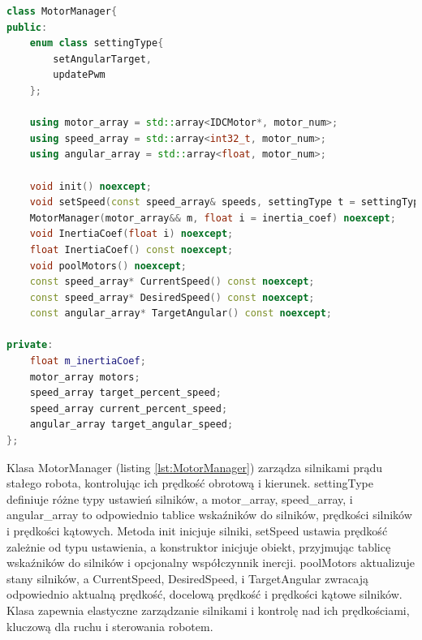 \documentclass[12pt,twoside]{article}
\begin{document}
\begin{lstlisting}[language=C++, caption={Klasa MotorManager}, label={lst:MotorManager}]
class MotorManager{
public:
    enum class settingType{
        setAngularTarget,
        updatePwm
    };

    using motor_array = std::array<IDCMotor*, motor_num>;
    using speed_array = std::array<int32_t, motor_num>; 
    using angular_array = std::array<float, motor_num>;

    void init() noexcept;
    void setSpeed(const speed_array& speeds, settingType t = settingType::updatePwm) noexcept;
    MotorManager(motor_array&& m, float i = inertia_coef) noexcept;
    void InertiaCoef(float i) noexcept;
    float InertiaCoef() const noexcept;
    void poolMotors() noexcept;
    const speed_array* CurrentSpeed() const noexcept;
    const speed_array* DesiredSpeed() const noexcept;
    const angular_array* TargetAngular() const noexcept;

private:
    float m_inertiaCoef;
    motor_array motors;
    speed_array target_percent_speed;
    speed_array current_percent_speed;
    angular_array target_angular_speed;
};
\end{lstlisting}

Klasa MotorManager (listing \ref{lst:MotorManager}) zarządza silnikami prądu stałego robota, kontrolując ich prędkość obrotową i kierunek. settingType definiuje różne typy ustawień silników, a motor\_array, speed\_array, i angular\_array to odpowiednio tablice wskaźników do silników, prędkości silników i prędkości kątowych. Metoda init inicjuje silniki, setSpeed ustawia prędkość zależnie od typu ustawienia, a konstruktor inicjuje obiekt, przyjmując tablicę wskaźników do silników i opcjonalny współczynnik inercji. poolMotors aktualizuje stany silników, a CurrentSpeed, DesiredSpeed, i TargetAngular zwracają odpowiednio aktualną prędkość, docelową prędkość i prędkości kątowe silników. Klasa zapewnia elastyczne zarządzanie silnikami i kontrolę nad ich prędkościami, kluczową dla ruchu i sterowania robotem.
\end{document}
